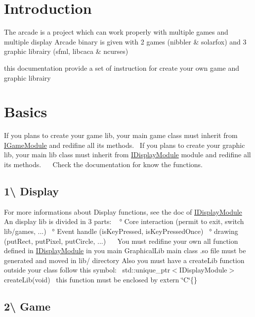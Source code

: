 \hypertarget{index_intro_sec}{}\section{Introduction}\label{index_intro_sec}
The arcade is a project which can work properly with multiple games and multiple display Arcade binary is given with 2 games (nibbler \& solarfox) and 3 graphic librairy (sfml, libcaca \& ncurses)

this documentation provide a set of instruction for create your own game and graphic librairy\hypertarget{index_Basics}{}\section{Basics}\label{index_Basics}
If you plans to create your game lib, your main game class must inherit from \hyperlink{class_i_game_module}{I\+Game\+Module} and redifine all its methods.~\newline
If you plans to create your graphic lib, your main lib class must inherit from \hyperlink{class_i_display_module}{I\+Display\+Module} module and redifine all its methods.~\newline
~\newline
Check the documentation for know the functions.\hypertarget{index_step1}{}\subsection{1\textbackslash{} Display}\label{index_step1}
For more informations about Display functions, see the doc of \hyperlink{class_i_display_module}{I\+Display\+Module} An display lib is divided in 3 parts\+: ~\newline
° Core interaction (permit to exit, switch lib/games, ...)~\newline
° Event handle (is\+Key\+Pressed, is\+Key\+Pressed\+Once)~\newline
° drawing (put\+Rect, put\+Pixel, put\+Circle, ...)~\newline
~\newline
 You must redifine your own all function defined in \hyperlink{class_i_display_module}{I\+Display\+Module} in you main Graphical\+Lib main class  .so file must be generated and moved in lib/ directory Also you must have a create\+Lib function outside your class follow this symbol\+:~\newline
 std\+::unique\+\_\+ptr$<$\+I\+Display\+Module$>$create\+Lib(void)~\newline
 this function must be enclosed by extern \char`\"{}\+C\char`\"{}\{\}\hypertarget{index_step2}{}\subsection{2\textbackslash{} Game}\label{index_step2}

